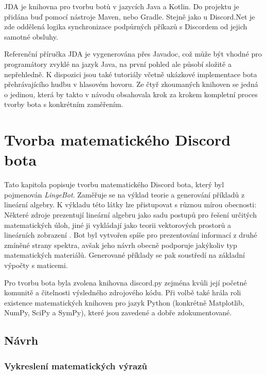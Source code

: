 \documentclass[FM]{tulthesis}
\begin{document}
	JDA je knihovna pro tvorbu botů v jazycích Java a Kotlin. Do projektu je přidána buď pomocí nástroje Maven, nebo Gradle. Stejně jako u Discord.Net je zde oddělená logika synchronizace podpůrných příkazů s Discordem od jejich samotné obsluhy.
	
	Referenční příručka JDA je vygenerována přes Javadoc, což může být vhodné pro programátory zvyklé na jazyk Java, na první pohled ale působí složitě a nepřehledně. K dispozici jsou také tutoriály včetně ukázkové implementace bota přehrávajícího hudbu v hlasovém hovoru. Ze čtyř zkoumaných knihoven se jedná o jedinou, která by takto v návodu obsahovala krok za krokem kompletní proces tvorby bota s konkrétním zaměřením.
	
	\chapter{Tvorba matematického Discord bota}\label{Chapter5}
	
	Tato kapitola popisuje tvorbu matematického Discord bota, který byl pojmenován \textit{LingeBot}. Zaměřuje se na výklad teorie a generování příkladů z lineární algebry. K výkladu této látky lze přistupovat s různou mírou obecnosti: Některé zdroje prezentují lineární algebru jako sadu postupů pro řešení určitých matematických úloh, jiné ji vykládají jako teorii vektorových prostorů a lineárních zobrazení \cite{lit_lingebra}. Bot byl vytvořen spíše pro prezentování informací z druhé zmíněné strany spektra, avšak jeho návrh obecně podporuje jakýkoliv typ matematických materiálů. Generované příklady se pak soustředí na základní výpočty s maticemi.
	
	Pro tvorbu bota byla zvolena knihovna discord.py zejména kvůli její početné komunitě a čitelnosti výsledného zdrojového kódu. Při volbě také hrála roli existence matematických knihoven pro jazyk Python (konkrétně Matplotlib, NumPy, SciPy a SymPy), které jsou zavedené a dobře zdokumentované.
		
	\section{Návrh}
	
	\subsection{Vykreslení matematických výrazů}
	
\end{document}

